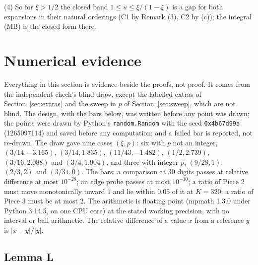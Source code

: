\documentclass[11pt]{article}
\begin{document}
(4) So for $\xi>1/2$ the closed band $1\le u\le\xi/(1-\xi)$ is a gap for both expansions in their natural orderings (C1 by Remark (3), C2 by (c)); the integral (MB) is the closed form there.

\section{Numerical evidence}\label{sec:num}

Everything in this section is evidence beside the proofs, not proof. It comes from the independent check's blind draw, except the labelled extras of Section~\ref{sec:extras} and the sweep in $p$ of Section~\ref{sec:sweep}, which are not blind. The design, with the bars below, was written before any point was drawn; the points were drawn by Python's \texttt{random.Random} with the seed \texttt{0x4b67d99a} (1265097114) and saved before any computation; and a failed bar is reported, not re-drawn. The draw gave nine cases $(\xi,p)$: six with $p$ not an integer, $(3/14,-3.165)$, $(3/14,1.835)$, $(11/43,-1.482)$, $(1/2,2.739)$, $(3/16,2.088)$ and $(3/4,1.904)$, and three with integer $p$, $(9/28,1)$, $(2/3,2)$ and $(3/31,0)$. The bars: a comparison at 30 digits passes at relative difference at most $10^{-28}$; an edge probe passes at most $10^{-10}$; a ratio of Piece 2 must move monotonically toward $1$ and lie within $0.05$ of it at $K=320$; a ratio of Piece 3 must be at most $2$. The arithmetic is floating point (mpmath 1.3.0 under Python 3.14.5, on one CPU core) at the stated working precision, with no interval or ball arithmetic. The relative difference of a value $x$ from a reference $y$ is $|x-y|/|y|$.

\subsection{Lemma L}
\end{document}
